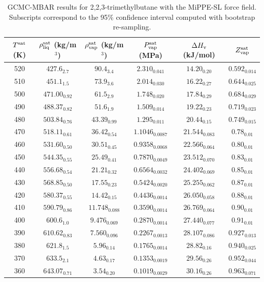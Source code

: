 \documentclass[journal=jctc,manuscript=article]{achemso}
\begin{document}
\begin{table}[htb!]
	\caption{GCMC-MBAR results for 2,2,3-trimethylbutane with the MiPPE-SL force field. Subscripts correspond to the 95\% confidence interval computed with bootstrap re-sampling.}
	\begin{center}
		\begin{tabular}{|c|c|c|c|c|c|}
			\hline
			$T^{\rm sat}$ (K) & $\rho_{\rm liq}^{\rm sat}$ (kg/m$^3$) & $\rho_{\rm vap}^{\rm sat}$ (kg/m$^3$) & $P_{\rm vap}^{\rm sat}$ (MPa) & $\Delta H_{\rm v}$ (kJ/mol) & $Z_{\rm vap}^{\rm sat}$ \\ \hline
			520 & $427.6_{2.7}$ & $90.4_{3.4}$ & $2.310_{0.041}$ & $14.20_{0.20}$ & $0.592_{0.014}$ \\
			510 & $451.1_{1.5}$ & $73.9_{3.6}$ & $2.014_{0.030}$ & $16.22_{0.27}$ & $0.644_{0.025}$ \\
			500 & $471.00_{0.92}$ & $61.5_{2.9}$ & $1.748_{0.020}$ & $17.84_{0.29}$ & $0.684_{0.029}$ \\
			490 & $488.37_{0.82}$ & $51.6_{1.9}$ & $1.509_{0.014}$ & $19.22_{0.23}$ & $0.719_{0.023}$ \\
			480 & $503.84_{0.76}$ & $43.39_{0.99}$ & $1.295_{0.011}$ & $20.44_{0.15}$ & $0.749_{0.015}$ \\
			470 & $518.11_{0.61}$ & $36.42_{0.54}$ & $1.1046_{0.0087}$ & $21.544_{0.083}$ & $0.78_{0.01}$ \\
			460 & $531.60_{0.50}$ & $30.51_{0.45}$ & $0.9358_{0.0068}$ & $22.566_{0.064}$ & $0.80_{0.01}$ \\
			450 & $544.35_{0.55}$ & $25.49_{0.41}$ & $0.7870_{0.0049}$ & $23.512_{0.070}$ & $0.83_{0.01}$ \\
			440 & $556.68_{0.54}$ & $21.21_{0.32}$ & $0.6564_{0.0032}$ & $24.402_{0.069}$ & $0.85_{0.01}$ \\
			430 & $568.85_{0.50}$ & $17.55_{0.23}$ & $0.5424_{0.0020}$ & $25.255_{0.062}$ & $0.87_{0.01}$ \\
			420 & $580.37_{0.55}$ & $14.42_{0.15}$ & $0.4436_{0.0014}$ & $26.050_{0.058}$ & $0.88_{0.01}$ \\
			410 & $590.79_{0.86}$ & $11.748_{0.088}$ & $0.3590_{0.0014}$ & $26.769_{0.064}$ & $0.90_{0.01}$ \\
			400 & $600.6_{1.0}$ & $9.476_{0.069}$ & $0.2870_{0.0014}$ & $27.440_{0.077}$ & $0.91_{0.01}$ \\
			390 & $610.62_{0.83}$ & $7.560_{0.096}$ & $0.2267_{0.0013}$ & $28.107_{0.086}$ & $0.927_{0.013}$ \\
			380 & $621.8_{1.5}$ & $5.96_{0.14}$ & $0.1765_{0.0014}$ & $28.82_{0.16}$ & $0.940_{0.025}$ \\
			370 & $633.5_{2.1}$ & $4.63_{0.17}$ & $0.1353_{0.0019}$ & $29.56_{0.26}$ & $0.952_{0.044}$ \\
			360 & $643.07_{0.71}$ & $3.54_{0.20}$ & $0.1019_{0.0029}$ & $30.16_{0.26}$ & $0.963_{0.071}$ \\
            \hline
		\end{tabular}
	\end{center}
\end{table}
\end{document}
